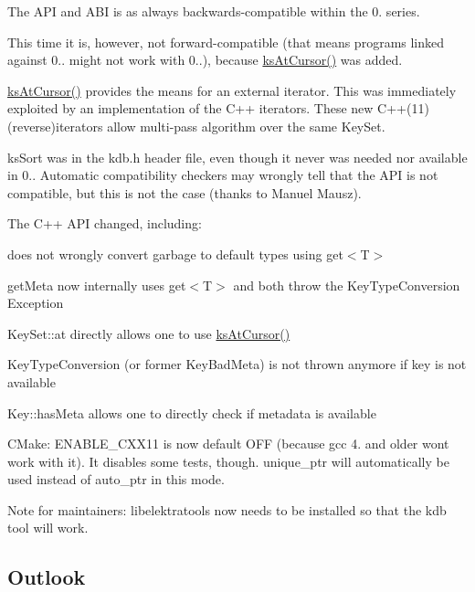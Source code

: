The A\+PI and A\+BI is as always backwards-\/compatible within the 0. series.

This time it is, however, not forward-\/compatible (that means programs linked against 0.. might not work with 0..), because \hyperlink{group__keyset_ga3604cc41505f7e19db945cece67190b6}{ks\+At\+Cursor()} was added.

\hyperlink{group__keyset_ga3604cc41505f7e19db945cece67190b6}{ks\+At\+Cursor()} provides the means for an external iterator. This was immediately exploited by an implementation of the C++ iterators. These new C++(11) (reverse)iterators allow multi-\/pass algorithm over the same Key\+Set.

ks\+Sort was in the kdb.\+h header file, even though it never was needed nor available in 0.. Automatic compatibility checkers may wrongly tell that the A\+PI is not compatible, but this is not the case (thanks to Manuel Mausz).

The C++ A\+PI changed, including\+:


\begin{DoxyItemize}
\item does not wrongly convert garbage to default types using {\ttfamily get$<$T$>$}
\item get\+Meta now internally uses {\ttfamily get$<$T$>$} and both throw the Key\+Type\+Conversion Exception
\item Key\+Set\+::at directly allows one to use \hyperlink{group__keyset_ga3604cc41505f7e19db945cece67190b6}{ks\+At\+Cursor()}
\item Key\+Type\+Conversion (or former Key\+Bad\+Meta) is not thrown anymore if key is not available
\item Key\+::has\+Meta allows one to directly check if metadata is available
\end{DoxyItemize}

C\+Make\+: E\+N\+A\+B\+L\+E\+\_\+\+C\+X\+X11 is now default O\+FF (because gcc 4. and older won\textquotesingle{}t work with it). It disables some tests, though. {\ttfamily unique\+\_\+ptr} will automatically be used instead of {\ttfamily auto\+\_\+ptr} in this mode.

Note for maintainers\+: libelektratools now needs to be installed so that the kdb tool will work.

\subsection*{Outlook}


